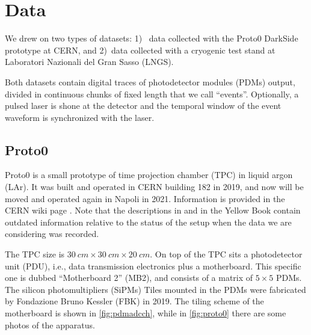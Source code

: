 \chapter{Data}
\label{ch:data}

We drew on two types of datasets: 1)~ data collected with the Proto0 DarkSide
prototype at CERN, and 2)~data collected with a cryogenic test stand at
Laboratori Nazionali del Gran Sasso (LNGS).


Both datasets contain digital traces of photodetector modules (PDMs) output,
divided in continuous chunks of fixed length that we call ``events''.
Optionally, a pulsed laser is shone at the detector and the temporal window of
the event waveform is synchronized with the laser.

\section{Proto0}
\label{sec:dataproto0}

Proto0 is a small prototype of time projection chamber (TPC) in liquid argon
(LAr). It was built and operated in CERN building 182 in 2019, and now will be
moved and operated again in Napoli in 2021. Information is provided in the CERN
wiki page \cite{proto0}. Note that the descriptions in
\cite[sec.~4.3.2]{luzzi2020} and in the Yellow Book \cite[65]{aalseth2018}
contain outdated information relative to the status of the setup when the data
we are considering was recorded.


The TPC size is $\SI{30}{cm} \times \SI{30}{cm} \times \SI{20}{cm}$. On top of
the TPC sits a photodetector unit (PDU), i.e., data transmission electronics
plus a motherboard. This specific one is dubbed ``Motherboard 2'' (MB2), and
consists of a matrix of $5\times 5$ PDMs. The silicon photomultipliers (SiPMs)
Tiles mounted in the PDMs were fabricated by Fondazione Bruno Kessler (FBK) in
2019. The tiling scheme of the motherboard is shown in \autoref{fig:pdmadcch},
while in \autoref{fig:proto0} there are some photos of the apparatus.

